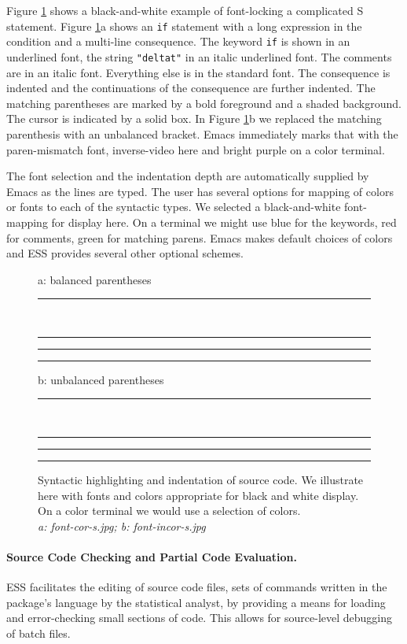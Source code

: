 \documentclass{article}
\newcommand{\stexttt}[1]{{\small\texttt{#1}}}
\newcommand{\emptyfig}{
\hspace*{42pt}\rule{324pt}{.25pt}\\
\hspace*{42pt}\rule{.25pt}{10pc}
\rule{316pt}{.25pt}
\rule{.25pt}{10pc}}
\begin{document}
Figure \ref{f.font} shows a black-and-white example of font-locking a
complicated S statement.  Figure \ref{f.font}a shows an \stexttt{if}
statement with a long expression in the condition and a multi-line
consequence.  The keyword \stexttt{if} is shown in an underlined font,
the string \stexttt{"deltat"} in an italic underlined font.  The
comments are in an italic font.  Everything else is in the standard
font.  The consequence is indented and the continuations of the
consequence are further indented.  The matching parentheses are marked
by a bold foreground and a shaded background.  The cursor is indicated
by a solid box.  In Figure \ref{f.font}b we replaced the matching
parenthesis with an unbalanced bracket.  Emacs immediately marks that
with the paren-mismatch font, inverse-video here and bright purple on
a color terminal.

The font selection and the indentation depth are automatically
supplied by Emacs as the lines are typed.  The user has several
options for mapping of colors or fonts to each of the syntactic types.
We selected a black-and-white font-mapping for display here.  On a
terminal we might use blue for the keywords, red for comments, green
for matching parens.  Emacs makes default choices of colors and ESS
provides several other optional schemes.

\begin{figure}
a: balanced parentheses\\
\emptyfig

b: unbalanced parentheses\\
\emptyfig
\caption[place holder for a long caption]{Syntactic highlighting and
indentation of source code.  We illustrate here with fonts and colors
appropriate for black and white display.  On a color terminal we would
use a selection of colors.\\
{\it a: font-cor-s.jpg; b: font-incor-s.jpg}
\label{f.font}}
\end{figure}

\paragraph{Source Code Checking and Partial Code Evaluation.}

ESS facilitates the editing of source code files, sets of commands
written in the package's language by the statistical analyst, by
providing a means for loading and error-checking small sections of
code.  This allows for source-level debugging of batch files.
\end{document}
